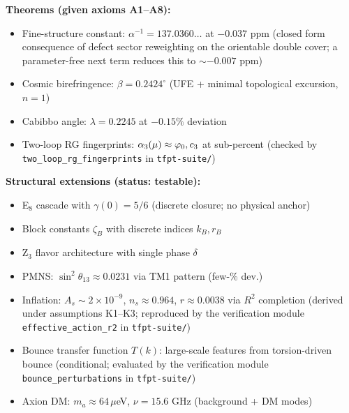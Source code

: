 \vspace{1em}
\begin{tcolorbox}[colback=gray!5, colframe=gray!60, title={\textbf{Claim Map: What This Paper Establishes}}, fonttitle=\bfseries]
\textbf{Theorems (given axioms A1--A8):}
\begin{itemize}[leftmargin=1.5em, topsep=2pt, itemsep=1pt]
    \item Fine-structure constant: $\alpha^{-1} = 137.0360\ldots$ at $-0.037$ ppm (closed form consequence of defect sector reweighting on the orientable double cover; a parameter-free next term reduces this to $\sim-0.007$ ppm)
    \item Cosmic birefringence: $\beta = 0.2424^\circ$ (UFE + minimal topological excursion, $n=1$)
    \item Cabibbo angle: $\lambda = 0.2245$ at $-0.15\%$ deviation
    \item Two-loop RG fingerprints: $\alpha_3(\mu) \approx \varphi_0, c_3$ at sub-percent (checked by \texttt{two\_loop\_rg\_fingerprints} in \texttt{tfpt-suite/})
\end{itemize}

\textbf{Structural extensions (status: testable):}
\begin{itemize}[leftmargin=1.5em, topsep=2pt, itemsep=1pt]
    \item E$_8$ cascade with $\gamma(0)=5/6$ (discrete closure; no physical anchor)
    \item Block constants $\zeta_B$ with discrete indices $k_B, r_B$
    \item Z$_3$ flavor architecture with single phase $\delta$
    \item PMNS: $\sin^2\theta_{13} \approx 0.0231$ via TM1 pattern (few-\% dev.)
    \item Inflation: $A_s \sim 2\times10^{-9}$, $n_s \approx 0.964$, $r \approx 0.0038$ via $R^2$ completion (derived under assumptions K1--K3; reproduced by the verification module \texttt{effective\_action\_r2} in \texttt{tfpt-suite/})
    \item Bounce transfer function $T(k)$: large-scale features from torsion-driven bounce (conditional; evaluated by the verification module \texttt{bounce\_perturbations} in \texttt{tfpt-suite/})
    \item Axion DM: $m_a \approx 64\,\mu$eV, $\nu = 15.6$ GHz (background + DM modes)
\end{itemize}


\end{tcolorbox}
